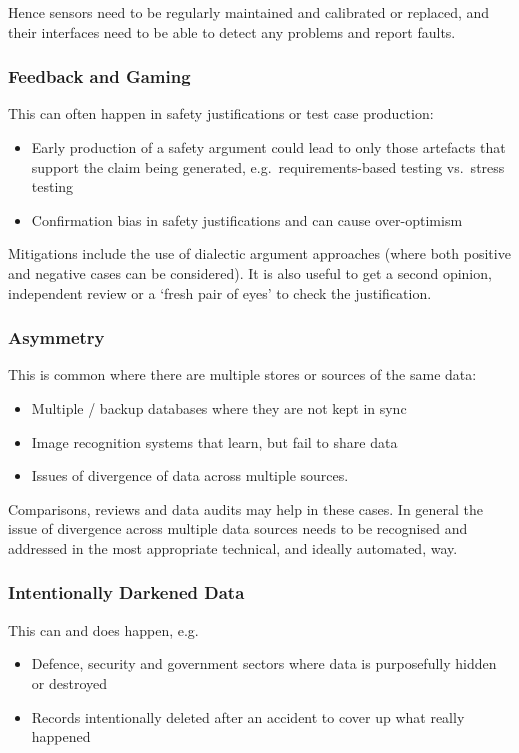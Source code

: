 Hence sensors need to be regularly maintained and calibrated or replaced, and their interfaces need to be able to detect any problems and report faults. 

\subsubsection{Feedback and Gaming}\label{bkm:dark11}
This can often happen in safety justifications or test case production:
\begin{itemize}
\item Early production of a safety argument could lead to only those artefacts that support the claim being generated, e.g.\ requirements-based testing vs.\ stress testing
  \item Confirmation bias in safety justifications and can cause over-optimism
\end{itemize}

Mitigations include the use of dialectic argument approaches (where both positive and negative cases can be considered). It is also useful to get a second opinion, independent review or a ‘fresh pair of eyes’ to check the justification.

\subsubsection{ Asymmetry}\label{bkm:dark12}
This is common where there are multiple stores or sources of the same data:
\begin{itemize}
\item Multiple / backup \glspl{database} where they are not kept in sync
  \item Image recognition systems that learn, but fail to share data
  \item Issues of divergence of data across multiple sources.
\end{itemize}

Comparisons, reviews and data audits may help in these cases. In general the issue of divergence across multiple data sources needs to be recognised and addressed in the most appropriate technical, and ideally automated, way.

\subsubsection{Intentionally Darkened Data}\label{bkm:dark13}
This can and does happen, e.g.
\begin{itemize}
\item Defence, security and government sectors where data is purposefully hidden or destroyed
  \item Records intentionally deleted after an accident to cover up what really happened
\end{itemize}

